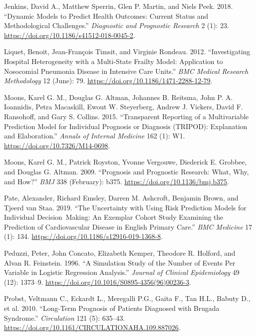 \documentclass[
]{article}
\newlength{\cslhangindent}
\newenvironment{cslreferences}%
  {\setlength{\parindent}{0pt}%
  \everypar{\setlength{\hangindent}{\cslhangindent}}\ignorespaces}%
  {\par}
\begin{document}
\begin{cslreferences}
\leavevmode\hypertarget{ref-jenkins_dynamic_2018}{}%
Jenkins, David A., Matthew Sperrin, Glen P. Martin, and Niels Peek. 2018. ``Dynamic Models to Predict Health Outcomes: Current Status and Methodological Challenges.'' \emph{Diagnostic and Prognostic Research} 2 (1): 23. \url{https://doi.org/10.1186/s41512-018-0045-2}.

\leavevmode\hypertarget{ref-liquet_investigating_2012}{}%
Liquet, Benoit, Jean-François Timsit, and Virginie Rondeau. 2012. ``Investigating Hospital Heterogeneity with a Multi-State Frailty Model: Application to Nosocomial Pneumonia Disease in Intensive Care Units.'' \emph{BMC Medical Research Methodology} 12 (June): 79. \url{https://doi.org/10.1186/1471-2288-12-79}.

\leavevmode\hypertarget{ref-moons_transparent_2015}{}%
Moons, Karel G. M., Douglas G. Altman, Johannes B. Reitsma, John P. A. Ioannidis, Petra Macaskill, Ewout W. Steyerberg, Andrew J. Vickers, David F. Ransohoff, and Gary S. Collins. 2015. ``Transparent Reporting of a Multivariable Prediction Model for Individual Prognosis or Diagnosis (TRIPOD): Explanation and Elaboration.'' \emph{Annals of Internal Medicine} 162 (1): W1. \url{https://doi.org/10.7326/M14-0698}.

\leavevmode\hypertarget{ref-moons_prognosis_2009}{}%
Moons, Karel G. M., Patrick Royston, Yvonne Vergouwe, Diederick E. Grobbee, and Douglas G. Altman. 2009. ``Prognosis and Prognostic Research: What, Why, and How?'' \emph{BMJ} 338 (February): b375. \url{https://doi.org/10.1136/bmj.b375}.

\leavevmode\hypertarget{ref-pate_uncertainty_2019}{}%
Pate, Alexander, Richard Emsley, Darren M. Ashcroft, Benjamin Brown, and Tjeerd van Staa. 2019. ``The Uncertainty with Using Risk Prediction Models for Individual Decision~Making: An Exemplar Cohort Study Examining the Prediction of Cardiovascular Disease in English Primary Care.'' \emph{BMC Medicine} 17 (1): 134. \url{https://doi.org/10.1186/s12916-019-1368-8}.

\leavevmode\hypertarget{ref-peduzzi_simulation_1996}{}%
Peduzzi, Peter, John Concato, Elizabeth Kemper, Theodore R. Holford, and Alvan R. Feinstein. 1996. ``A Simulation Study of the Number of Events Per Variable in Logistic Regression Analysis.'' \emph{Journal of Clinical Epidemiology} 49 (12): 1373--9. \url{https://doi.org/10.1016/S0895-4356(96)00236-3}.

\leavevmode\hypertarget{ref-probst_long-term_2010}{}%
Probst, Veltmann C., Eckardt L., Meregalli P.G., Gaita F., Tan H.L., Babuty D., et al. 2010. ``Long-Term Prognosis of Patients Diagnosed with Brugada Syndrome.'' \emph{Circulation} 121 (5): 635--43. \url{https://doi.org/10.1161/CIRCULATIONAHA.109.887026}.


\end{cslreferences}
\end{document}
